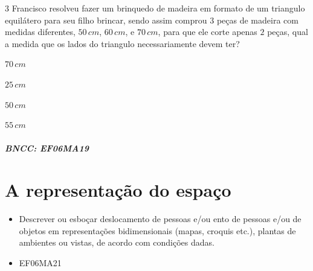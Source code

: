 {\num{3}  Francisco resolveu fazer um brinquedo de madeira em formato de um
triangulo equilátero para seu filho brincar, sendo assim comprou $3$ peças
de madeira com medidas diferentes, $50\,cm$, $60\,cm$, e $70\,cm$, para que ele
corte apenas $2$ peças, qual a medida que os lados do triangulo
necessariamente devem ter?

\begin{escolha}
\item $70\,cm$
\item $25\,cm$
\item $50\,cm$
\item $55\,cm$
\end{escolha}

\paragraph{BNCC: EF06MA19 }


\chapter{A representação do espaço}

\begin{itemize}
\item Descrever ou esboçar deslocamento de pessoas e/ou
ento de pessoas e/ou de objetos em representações bidimensionais (mapas, croquis etc.),
plantas de ambientes ou vistas, de acordo com condições dadas.
\end{itemize}

\begin{itemize}
\item EF06MA21
\end{itemize}

}
